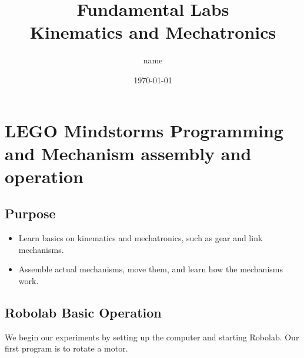 \documentclass[12pt,a4paper]{report}
\title{Fundamental Labs\\Kinematics and Mechatronics}
\author{name}
\date{\today}
\begin{document}
\maketitle
\tableofcontents

\chapter{LEGO Mindstorms Programming and Mechanism assembly and operation}

\section{Purpose}
\begin{itemize}
    \item Learn basics on kinematics and mechatronics, such as gear and link mechanisms.
    \item Assemble actual mechanisms, move them, and learn how the mechanisms work.
\end{itemize}
\section{Robolab Basic Operation}
We begin our experiments by setting up the computer and starting Robolab. 
Our first program is to rotate a motor.
\end{document}
